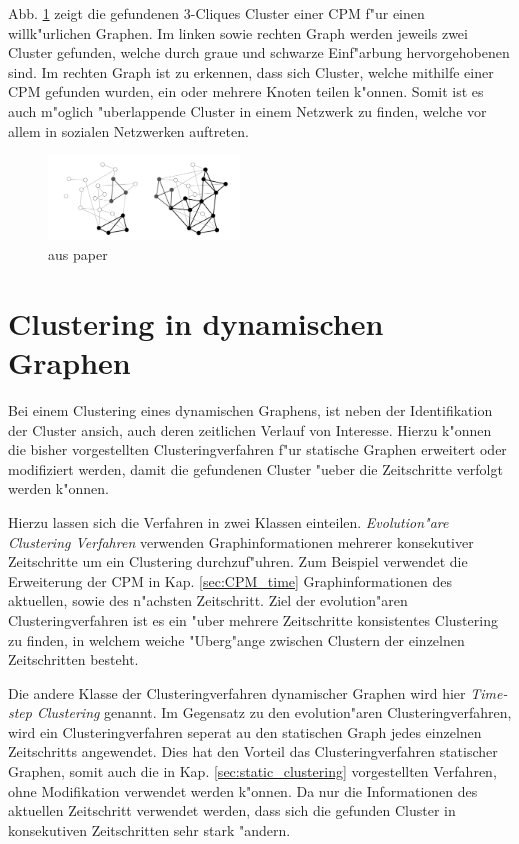 \documentclass[journal]{vgtc}
\begin{document}
    Abb. \ref{fig:CPM} zeigt die gefundenen 3-Cliques Cluster einer CPM f"ur einen willk"urlichen Graphen.
    Im linken sowie rechten Graph werden jeweils zwei Cluster gefunden, welche durch graue und schwarze
    Einf"arbung hervorgehobenen sind. Im rechten Graph ist zu erkennen, dass sich Cluster, welche mithilfe einer
    CPM gefunden wurden, ein oder mehrere Knoten teilen k"onnen. Somit ist es auch m"oglich "uberlappende Cluster
    in einem Netzwerk zu finden, welche vor allem in sozialen Netzwerken auftreten.
    \begin{figure}[h]
     \centering
     \includegraphics[width=2in]{images/k-cliques}
     \caption{\label{fig:CPM} aus paper}
    \end{figure}


\section{Clustering in dynamischen Graphen}
  Bei einem Clustering eines dynamischen Graphens, ist neben der Identifikation der Cluster ansich, auch deren
  zeitlichen Verlauf von Interesse. Hierzu k"onnen die bisher vorgestellten Clusteringverfahren f"ur statische
  Graphen erweitert oder modifiziert werden, damit die gefundenen Cluster "ueber die Zeitschritte verfolgt werden
  k"onnen.
  
  Hierzu lassen sich die Verfahren in zwei Klassen einteilen. \emph{Evolution"are Clustering Verfahren}\cite{evolutionary_clustering}
  verwenden Graphinformationen mehrerer konsekutiver Zeitschritte um ein Clustering durchzuf"uhren. Zum Beispiel verwendet die Erweiterung der CPM
  in Kap. \ref{sec:CPM_time} Graphinformationen des aktuellen, sowie des n"achsten Zeitschritt. Ziel der evolution"aren Clusteringverfahren
  ist es ein "uber mehrere Zeitschritte konsistentes Clustering zu finden, in welchem weiche "Uberg"ange zwischen Clustern der einzelnen Zeitschritten
  besteht.
  
  Die andere Klasse der Clusteringverfahren dynamischer Graphen wird hier \emph{Time-step Clustering} genannt. Im Gegensatz zu den evolution"aren
  Clusteringverfahren, wird ein Clusteringverfahren seperat au den statischen Graph jedes einzelnen Zeitschritts angewendet. Dies hat den Vorteil das
  Clusteringverfahren statischer Graphen, somit auch die in Kap. \ref{sec:static_clustering} vorgestellten Verfahren, ohne Modifikation
  verwendet werden k"onnen. Da nur die Informationen des aktuellen Zeitschritt verwendet werden, dass sich die gefunden Cluster in konsekutiven
  Zeitschritten sehr stark "andern.
  
\end{document}
